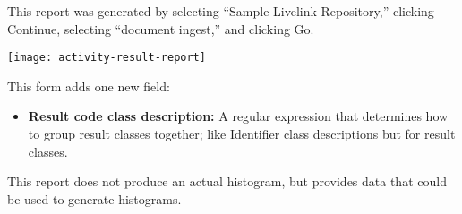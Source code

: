 \begin{changemargin}{1.5in}{0in}
This report was generated by selecting ``Sample Livelink Repository,''
clicking Continue, selecting ``document ingest,'' and clicking Go.

\texttt{[image: activity-result-report]}

This form adds one new field:

\begin{itemize}

\item \textbf{Result code class description:} A regular expression that
determines how to group result classes together; like Identifier class
descriptions but for result classes.

\end{itemize}

This report does not produce an actual histogram, but provides data that
could be used to generate histograms.  


\end{changemargin}
